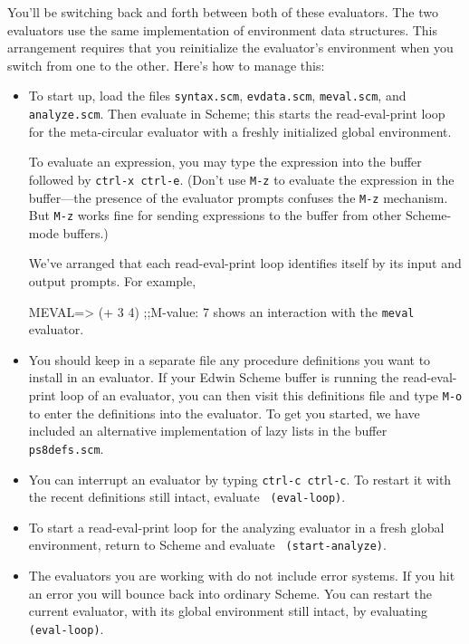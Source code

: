 You'll be switching back and forth between both of these evaluators.  The
two evaluators use the same implementation of environment data structures.
This arrangement requires that you reinitialize the evaluator's environment
when you switch from one to the other.  Here's how to manage this:
\begin{itemize}

\item
To start up, load the files {\tt syntax.scm}, {\tt evdata.scm},
{\tt meval.scm}, and {\tt analyze.scm}.  Then evaluate
 in Scheme; this starts the read-eval-print loop
for the meta-circular evaluator with a freshly initialized global
environment.

To evaluate an expression, you may type the expression into the
 buffer followed by {\tt ctrl-x ctrl-e}.  (Don't use
{\tt M-z} to evaluate the expression in the 
buffer---the presence of the evaluator prompts confuses the {\tt M-z}
mechanism.  But {\tt M-z} works fine for sending expressions to the
 buffer from other Scheme-mode buffers.)

We've arranged that each read-eval-print loop identifies itself by its
input and output prompts.  For example,

\beginlisp
MEVAL=> (+ 3 4)
;;M-value: 7
\endlisp
shows an interaction with the {\tt meval} evaluator.

\item
You should keep in a separate file any procedure definitions you want to
install in an evaluator.  If your Edwin Scheme buffer is running the
read-eval-print loop of an evaluator, you can then visit this definitions
file and type {\tt M-o} to enter the definitions into the evaluator.  To
get you started, we have included an alternative implementation of lazy
lists in the buffer {\tt ps8defs.scm}.

\item You can interrupt an evaluator by typing {\tt ctrl-c ctrl-c}.
To restart it with the recent definitions still intact, evaluate {\tt
(eval-loop)}.

\item To start a read-eval-print loop for the analyzing evaluator in a
fresh global environment, return to Scheme and evaluate {\tt
(start-analyze)}.

\item The evaluators you are working with do not include error
systems.  If you hit an error you will bounce back into ordinary
Scheme.  You can restart the current evaluator, with its global
environment still intact, by evaluating {\tt (eval-loop)}.


\end{itemize}

